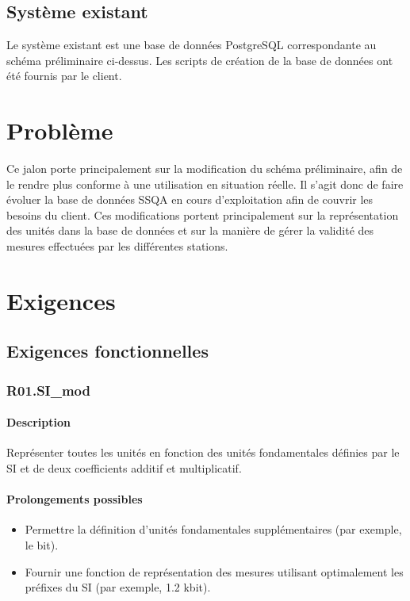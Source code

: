 \documentclass{article}
\begin{document}
\subsection{Système existant}
Le système existant est une base de données PostgreSQL correspondante
au schéma préliminaire ci-dessus. Les scripts de création de la base de données ont
été fournis par le client.

\section{Problème}
Ce jalon porte principalement sur la modification du schéma préliminaire, afin
de le rendre plus conforme à une utilisation en situation réelle. Il s'agit donc de
faire évoluer la base de données SSQA en cours d'exploitation afin de couvrir
les besoins du client. Ces modifications portent principalement sur la représentation
des unités dans la base de données et sur la manière de gérer la validité des 
mesures effectuées par les différentes stations.

\section{Exigences}
\subsection{Exigences fonctionnelles}
\subsubsection{R01.SI\_mod}
\paragraph{Description} Représenter toutes les unités en fonction des unités fondamentales définies par le SI
et de deux coefficients additif et multiplicatif.

\paragraph{Prolongements possibles}
\begin{itemize}
    \item Permettre la définition d'unités fondamentales supplémentaires (par exemple, le bit).
    \item Fournir une fonction de représentation des mesures utilisant optimalement les préfixes du SI (par exemple, 1.2 kbit).
\end{itemize}
\end{document}
